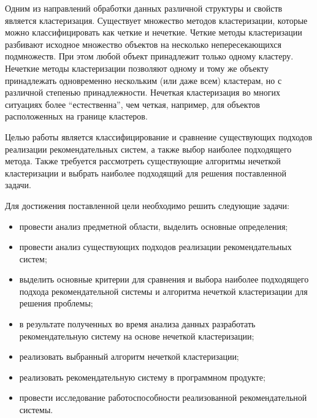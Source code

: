Одним из направлений обработки данных различной структуры и свойств является кластеризация. Существует множество методов кластеризации, которые можно классифицировать как четкие и нечеткие. Четкие методы кластеризации разбивают исходное множество объектов на несколько непересекающихся подмножеств. При этом любой объект принадлежит только одному кластеру. Нечеткие методы кластеризации позволяют одному и тому же объекту принадлежать одновременно нескольким (или даже всем) кластерам, но с различной степенью принадлежности. Нечеткая кластеризация во многих ситуациях более “естественна”, чем четкая, например, для объектов расположенных на границе кластеров.

Целью работы является классифицирование и сравнение существующих подходов реализации рекомендательных систем, а также выбор наиболее подходящего метода. Также требуется рассмотреть существующие алгоритмы нечеткой кластеризации и выбрать наиболее подходящий для решения поставленной задачи.

Для достижения поставленной цели необходимо решить следующие задачи:
\begin{itemize}
	\item провести анализ предметной области, выделить основные определения;
	\item провести анализ существующих подходов реализации рекомендательных
	систем;
	\item выделить основные критерии для сравнения и выбора наиболее
	подходящего подхода рекомендательной системы и алгоритма нечеткой
	кластеризации для решения проблемы;
	\item в результате полученных во время анализа данных разработать рекомендательную систему на основе нечеткой кластеризации;
	\item реализовать выбранный алгоритм нечеткой кластеризации;
	\item реализовать рекомендательную систему в программном продукте;
	\item провести исследование работоспособности реализованной рекомендательной системы.
\end{itemize}

\pagebreak